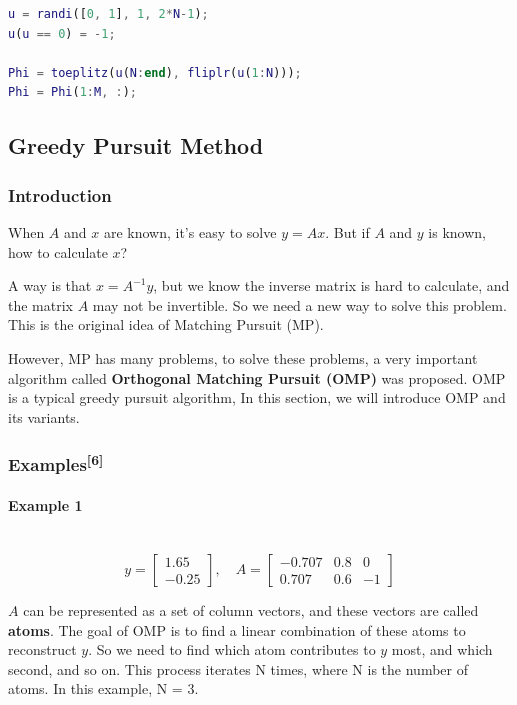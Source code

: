 \documentclass[12pt]{ctexart}
\begin{document}
\begin{lstlisting}[language=Matlab]
%% Toeplitz Matrix Example
u = randi([0, 1], 1, 2*N-1);
u(u == 0) = -1;

Phi = toeplitz(u(N:end), fliplr(u(1:N)));
Phi = Phi(1:M, :);
\end{lstlisting}

\subsection{\textbf{Greedy Pursuit Method}}

\subsubsection{\textbf{Introduction}}

When $A$ and $x$ are known, it's easy to solve $y = Ax$. But if $A$ and $y$ is known,
how to calculate $x$?

A way is that $x = A^{-1}y$, but we know the inverse matrix is hard to calculate,
and the matrix $A$ may not be invertible. So we need a new way to solve this problem.
This is the original idea of Matching Pursuit (MP).

However, MP has many problems, to solve these problems, a very important algorithm
called \textbf{Orthogonal Matching Pursuit (OMP)} was proposed. OMP is a typical greedy
pursuit algorithm, In this section, we will introduce OMP and its variants.

\subsubsection[\textbf{Examples}]{\textbf{Examples}\textsuperscript{[6]}}

\paragraph{\textbf{Example 1}}\mbox{}\\
\[
  y = \begin{bmatrix} 1.65 \\ -0.25 \end{bmatrix}, \quad
  A = \begin{bmatrix} -0.707 & 0.8 & 0 \\ 0.707 & 0.6 & -1 \end{bmatrix}
\]

$A$ can be represented as a set of column vectors, and these vectors are called
\textbf{atoms}. The goal of OMP is to find a linear combination of these atoms to
reconstruct $y$. So we need to find which atom contributes to $y$ most, and which
second, and so on. This process iterates N times, where N is the number of atoms.
In this example, N = 3.
\end{document}
